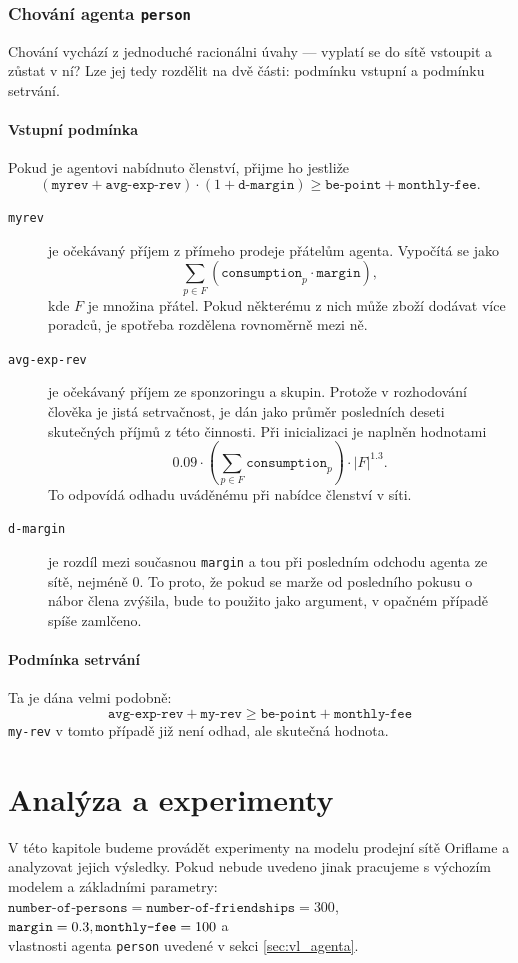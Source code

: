 \documentclass[a4wide,12pt]{report}
\begin{document}
\subsection{Chování agenta \texttt{person}}
Chování vychází z jednoduché racionálni úvahy --- vyplatí se do sítě vstoupit a zůstat v ní? Lze jej tedy rozdělit na dvě části: podmínku vstupní a podmínku setrvání.
\subsubsection{Vstupní podmínka}
Pokud je agentovi nabídnuto členství, přijme ho jestliže
\[(\texttt{myrev} + \texttt{avg-exp-rev}) \cdot (1+\texttt{d-margin}) \geq \texttt{be-point} + \texttt{monthly-fee}.\]
\begin{description}
\item[\texttt{myrev}] je očekávaný příjem z přímeho prodeje přátelům agenta. Vypočítá se jako \[\sum_{p\in F}(\texttt{consumption}_p\cdot\texttt{margin}),\]
kde $F$ je množina přátel. Pokud některému z nich může zboží dodávat více poradců, je spotřeba rozdělena rovnoměrně mezi ně.
\item[\texttt{avg-exp-rev}] je očekávaný příjem ze sponzoringu a skupin. Protože v rozhodování člověka je jistá setrvačnost, je dán jako průměr posledních deseti skutečných příjmů z této činnosti. Při inicializaci je naplněn hodnotami
\[ 0.09\cdot (\sum_{p\in F}\texttt{consumption}_p)\cdot |F|^{1.3}.\]
To odpovídá odhadu uváděnému při nabídce členství v síti.
\item[\texttt{d-margin}] je rozdíl mezi současnou \texttt{margin} a tou při posledním odchodu agenta ze sítě, nejméně 0. To proto, že pokud se marže od posledního pokusu o nábor člena zvýšila, bude to použito jako argument, v opačném případě spíše zamlčeno.
\end{description}
\subsubsection{Podmínka setrvání}
Ta je dána velmi podobně:
\[ \texttt{avg-exp-rev} + \texttt{my-rev} \geq \texttt{be-point} + \texttt{monthly-fee} \]
\texttt{my-rev} v tomto případě již není odhad, ale skutečná hodnota.
%
%
%
\chapter{Analýza a experimenty}
V této kapitole budeme provádět experimenty na modelu prodejní sítě Oriflame a analyzovat jejich výsledky. Pokud nebude uvedeno jinak pracujeme s výchozím modelem a základními parametry:\\
$\texttt{number-of-persons}=\texttt{number-of-friendships}=300$, \\
$\texttt{margin}=0.3,\\\texttt{monthly-fee}=100$ a\\
vlastnosti agenta \texttt{person} uvedené v sekci \ref{sec:vl_agenta}.
\end{document}
